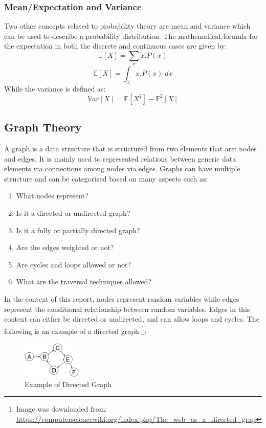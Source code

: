 \documentclass{article}
\begin{document}
\subsubsection{Mean/Expectation and Variance}
Two other concepts related to probability theory are mean and variance which can be used to describe a probability distribution. The mathematical formula for the expectation in both the discrete and continuous cases are given by:
\begin{equation}
\mathbb{E} [X] = \sum_x x.P(x)
\end{equation}
\begin{equation}
\mathbb{E} [X] = \int_x x.P(x) \; dx
\end{equation}
While the variance is defined as: 
\begin{equation}
\mathbb{V}ar [X] = \mathbb{E} [X^2] - \mathbb{E}^2 [X]
\end{equation}
\subsection{Graph Theory}
A graph is a data structure that is structured from two elements that are: nodes and edges. It is mainly used to represented relations between generic data elements via connections among nodes via edges. Graphs can have multiple structure and can be categorized based on many aspects such as:
\begin{enumerate}
\item What nodes represent?
\item Is it a directed or undirected graph?
\item Is it a fully or partially directed graph?
\item Are the edges weighted or not?
\item Are cycles and loops allowed or not?
\item What are the traversal techniques allowed?
\end{enumerate}
In the context of this report, nodes represent random variables while edges represent the conditional relationship between random variables. Edges in this context can either be directed or undirected, and can allow loops and cycles. The following is an example of a directed graph \footnote{Image was downloaded from: \url{https://computersciencewiki.org/index.php/The_web_as_a_directed_grap}}:
\begin{figure}[H]
\centering
\includegraphics[width=0.25\textwidth]{Directed_graph.png}
\caption{Example of Directed Graph }
\end{figure}
\end{document}
